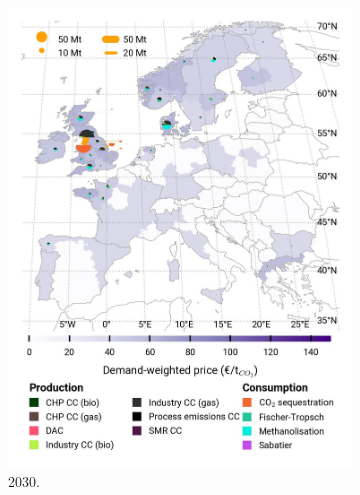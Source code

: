 \documentclass[preprint,12pt,sort&compress]{elsarticle}
\begin{document}
\begin{figure}[htbp]
\begin{subfigure}[t]{0.33\textwidth}
      \includegraphics[width=1\textwidth]{maps/no-pipelines-no-pcipmi/base_s_adm___2030-balance_map_co2_stored} 
      \caption{ 2030.}
      \label{fig:DI_lt_2030_co2}
  \end{subfigure}
  \begin{subfigure}[t]{0.33\textwidth}
      \vspace{0pt}

\end{subfigure}
\end{figure}
\end{document}
